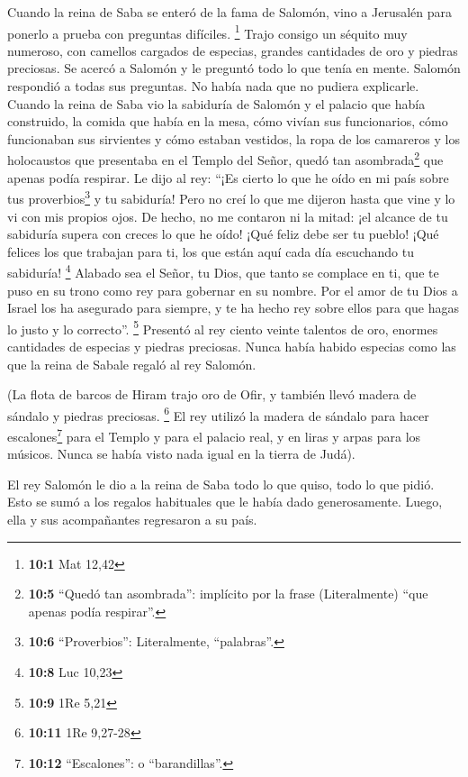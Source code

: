  Cuando la reina de Saba se enteró de la fama de Salomón,
vino a Jerusalén para ponerlo a prueba con preguntas difíciles.
\footnote{\textbf{10:1} Mat 12,42}  Trajo consigo un
séquito muy numeroso, con camellos cargados de especias, grandes
cantidades de oro y piedras preciosas. Se acercó a Salomón y le preguntó
todo lo que tenía en mente.  Salomón respondió a todas sus
preguntas. No había nada que no pudiera explicarle. 
Cuando la reina de Saba vio la sabiduría de Salomón y el palacio que
había construido,  la comida que había en la mesa, cómo
vivían sus funcionarios, cómo funcionaban sus sirvientes y cómo estaban
vestidos, la ropa de los camareros y los holocaustos que presentaba en
el Templo del Señor, quedó tan asombrada\footnote{\textbf{10:5} ``Quedó
  tan asombrada'': implícito por la frase (Literalmente) ``que apenas
  podía respirar''.} que apenas podía respirar.  Le dijo
al rey: ``¡Es cierto lo que he oído en mi país sobre tus
proverbios\footnote{\textbf{10:6} ``Proverbios'': Literalmente,
  ``palabras''.} y tu sabiduría!  Pero no creí lo que me
dijeron hasta que vine y lo vi con mis propios ojos. De hecho, no me
contaron ni la mitad: ¡el alcance de tu sabiduría supera con creces lo
que he oído!  ¡Qué feliz debe ser tu pueblo! ¡Qué felices
los que trabajan para ti, los que están aquí cada día escuchando tu
sabiduría! \footnote{\textbf{10:8} Luc 10,23}  Alabado sea
el Señor, tu Dios, que tanto se complace en ti, que te puso en su trono
como rey para gobernar en su nombre. Por el amor de tu Dios a Israel los
ha asegurado para siempre, y te ha hecho rey sobre ellos para que hagas
lo justo y lo correcto''. \footnote{\textbf{10:9} 1Re 5,21}
 Presentó al rey ciento veinte talentos de oro, enormes
cantidades de especias y piedras preciosas. Nunca había habido especias
como las que la reina de Sabale regaló al rey Salomón.

 (La flota de barcos de Hiram trajo oro de Ofir, y
también llevó madera de sándalo y piedras preciosas. \footnote{\textbf{10:11}
  1Re 9,27-28}  El rey utilizó la madera de sándalo para
hacer escalones\footnote{\textbf{10:12} ``Escalones'': o
  ``barandillas''.} para el Templo y para el palacio real, y en liras y
arpas para los músicos. Nunca se había visto nada igual en la tierra de
Judá).

 El rey Salomón le dio a la reina de Saba todo lo que
quiso, todo lo que pidió. Esto se sumó a los regalos habituales que le
había dado generosamente. Luego, ella y sus acompañantes regresaron a su
país.

